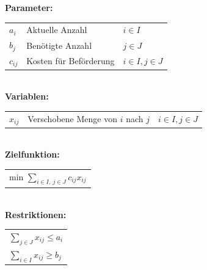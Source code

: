   \textbf{Parameter:}\\
  \begin{tabular}{lll}
    $a_{i}$ & Aktuelle Anzahl & $i \in I$ \\
    $b_j$   & Benötigte Anzahl& $j \in J$\\
    $c_{ij}$& Kosten für Beförderung & $i \in I, j \in J$\\
  \end{tabular}\\
  
  \textbf{Variablen:}\\
  \begin{tabular}{lll}
    $x_{ij}$ & Verschobene Menge von $i$ nach $j$ & $i \in I, j \in J$\\
  \end{tabular}\\
  
  \textbf{Zielfunktion:}\\
  \begin{tabular}{l}
    min $\sum\limits_{i \in I,~j \in J}c_{ij} x_{ij}$\\
  \end{tabular}\\
  
  \textbf{Restriktionen:}\\
  \begin{tabular}{l}
    $\sum\limits_{j \in J}x_{ij}\leq a_{i}$\\
    $\sum\limits_{i \in I}x_{ij}\geq b_{j}$\\
  \end{tabular}\\
  
